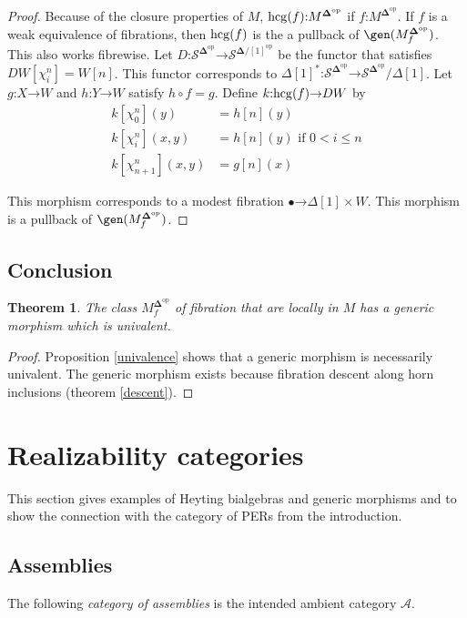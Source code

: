 \documentclass{amsart}
\theoremstyle{plain}
\newtheorem{theorem}{Theorem}
\theoremstyle{definition}
\newcommand\cat\mathcal
\newcommand\ri{^*}
\newcommand\dual{^{\mathrm{op}}}
\newcommand\simCat{\mathbf\Delta}
\newcommand\s{^{\simCat\dual}}
\newcommand\of{\mathord:}
\renewcommand\to{\mathord\rightarrow}
\newcommand\simplex\Delta
\newcommand\f{_f}
\begin{document}
\begin{proof} Because of the closure properties of $M$, $\hcg(f)\of M\s$ if $f\of M\s$. If $f$ is a weak equivalence of fibrations, then $\mathrm{hcg}(f)$ is the a pullback of $\gen(M\s\f)$. This also works fibrewise. Let $D\of \cat S\s\to \cat S^{\simCat/[1]\dual}$ be the functor that satisfies $DW[\chi^n_i]=W[n]$. This functor corresponds to $\simplex[1]\ri\of \cat S\s\to \cat S\s/\simplex[1]$. Let $g\of X\to W$ and $h\of Y\to W$ satisfy $h\circ f=g$. Define $k\of\hcg(f) \to DW$ by
\begin{align*}
k[\chi^n_0](y) &= h[n](y)\\
k[\chi^n_i](x,y) &= h[n](y) \textrm{ if $0<i\leq n$}\\
k[\chi^n_{n+1}](x,y) &= g[n](x)
\end{align*}

This morphism corresponds to a modest fibration $\bullet\to \simplex[1]\times W$. This morphism is a pullback of $\gen(M\s\f)$.
\end{proof}

\subsection{Conclusion}

\begin{theorem} The class $M\s\f$ of fibration that are locally in $M$ has a generic morphism which is univalent. \label{univalent universe}\end{theorem} 

\begin{proof} Proposition \ref{univalence} shows that a generic morphism is necessarily univalent. The generic morphism exists because fibration descent along horn inclusions (theorem \ref{descent}). \end{proof}

\section{Realizability categories}
This section gives examples of Heyting bialgebras and generic morphisms and to show the connection with the category of PERs from the introduction.


\subsection{Assemblies}
The following \emph{category of assemblies} is the intended ambient category $\cat A$.
\end{document}
